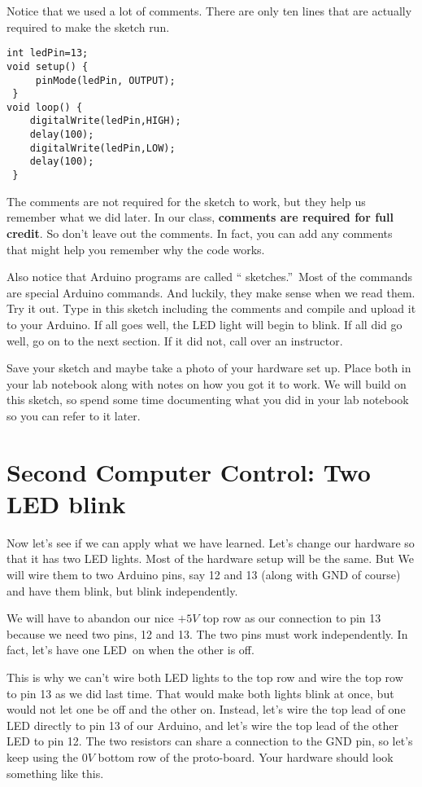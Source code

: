 Notice that we used a lot of comments. There are only ten lines that are
actually required to make the sketch run.

\begin{lstlisting}[language=Arduino] 
int ledPin=13;
void setup() {
	 pinMode(ledPin, OUTPUT);
 }
void loop() {
	digitalWrite(ledPin,HIGH);
	delay(100);
	digitalWrite(ledPin,LOW);
	delay(100);
 }
\end{lstlisting}

The comments are not required for the sketch to work, but they help us
remember what we did later. In our class, \textbf{comments are required for
full credit}. So don't leave out the comments. In fact, you can add any
comments that might help you remember why the code works.

Also notice that Arduino programs are called \textquotedblleft
sketches.\textquotedblright\ Most of the commands are special Arduino
commands. And luckily, they make sense when we read them. Try it out. Type
in this sketch including the comments and compile and upload it to your
Arduino. If all goes well, the LED light will begin to blink. If all did go
well, go on to the next section. If it did not, call over an instructor.

Save your sketch and maybe take a photo of your hardware set up. Place both
in your lab notebook along with notes on how you got it to work. We will
build on this sketch, so spend some time documenting what you did in your
lab notebook so you can refer to it later.

\section{Second Computer Control: Two LED blink}

Now let's see if we can apply what we have learned. Let's change our
hardware so that it has two LED lights. Most of the hardware setup will be
the same. But We will wire them to two Arduino pins, say 12 and 13 (along
with GND of course) and have them blink, but blink independently.

We will have to abandon our nice $+5\unit{V}$ top row as our connection to
pin 13 because we need two pins, 12 and 13. The two pins must work
independently. In fact, let's have one LED\ on when the other is off.

This is why we can't wire both LED lights to the top row and wire the top
row to pin 13 as we did last time. That would make both lights blink at
once, but would not let one be off and the other on. Instead, let's wire the
top lead of one LED directly to pin 13 of our Arduino, and let's wire the
top lead of the other LED to pin 12. The two resistors can share a
connection to the GND pin, so let's keep using the $0\unit{V}$ bottom row of
the proto-board. Your hardware should look something like this.

